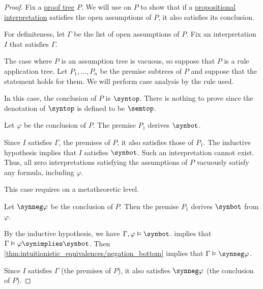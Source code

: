 \begin{proof}
  Fix a \hyperref[def:propositional_natural_deduction_proof_tree]{proof tree} \( P \). We will use  on \( P \) to show that if a \hyperref[def:propositional_interpretation]{propositional interpretation} satisfies the open assumptions of \( P \), it also satisfies its conclusion.

  For definiteness, let \( \Gamma \) be the list of open assumptions of \( P \). Fix an interpretation \( I \) that satisfies \( \Gamma \).

  The case where \( P \) is an assumption tree is vacuous, so suppose that \( P \) is a rule application tree. Let \( P_1, \ldots, P_n \) be the premise subtrees of \( P \) and suppose that the statement holds for them. We will perform case analysis by the rule used.

   In this case, the conclusion of \( P \) is \( \syntop \). There is nothing to prove since the denotation of \( \syntop \) is defined to be \( \semtop \).

   Let \( \varphi \) be the conclusion of \( P \). The premise \( P_1 \) derives \( \synbot \).

  Since \( I \) satisfies \( \Gamma \), the premises of \( P \), it also satisfies those of \( P_1 \). The inductive hypothesis implies that \( I \) satisfies \( \synbot \). Such an interpretation cannot exist. Thus, all zero interpretations satisfying the assumptions of \( P \) vacuously satisfy any formula, including \( \varphi \).

  This case requires  on a metatheoretic level.

   Let \( \synneg \varphi \) be the conclusion of \( P \). Then the premise \( P_1 \) derives \( \synbot \) from \( \varphi \).

  By the inductive hypothesis, we have \( \Gamma, \varphi \vDash \synbot \).  implies that \( \Gamma \vDash \varphi \synimplies \synbot \). Then \cref{thm:intuitionistic_equivalences/negation_bottom} implies that \( \Gamma \vDash \synneg \varphi \).

  Since \( I \) satisfies \( \Gamma \) (the premises of \( P \)), it also satisfies \( \synneg \varphi \) (the conclusion of \( P \)).


\end{proof}
